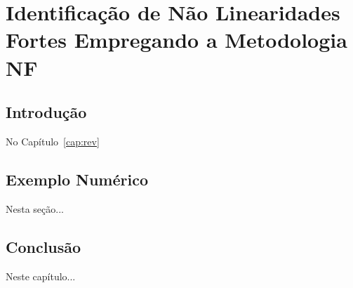 \chapter{Identificação de Não Linearidades Fortes Empregando a Metodologia \acs{NF}}
\label{cap:res1} \vspace{-1cm} \vspace{1cm}
%
\section{Introdução}  
%
\label{sec:res1_intro}
%
\par
No Capítulo~\ref{cap:rev}

\section{Exemplo Numérico} 
%
\label{sec:res1_exe}
%
\par
Nesta seção...


\section{Conclusão} 
%
\label{sec:conc_NF+MOESP}
%
Neste capítulo...

%
\clearpage
%





